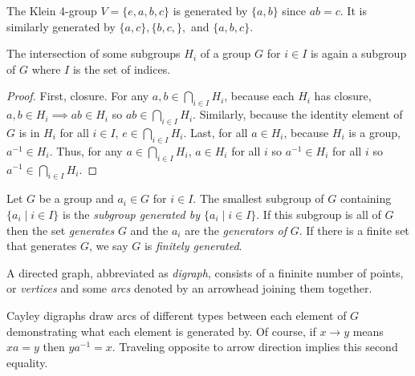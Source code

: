 \begin{example}
    The Klein 4-group $V = \{e,a,b,c\}$ is generated by $\{a,b\}$ since $ab =c$. It is similarly generated by $\{a,c\},\{b,c,\},$ and $\{a,b,c\}$.
\end{example}
\begin{theorem}
    The intersection of some subgroups $H_i$ of a group $G$ for $i \in I$ is again a subgroup of $G$ where $I$ is the set of indices.
\end{theorem}
\begin{proof}
    First, closure. For any $a,b \in \bigcap_{i\in I}H_i$, because each $H_i$ has closure, $a,b \in H_i \implies ab \in H_i$ so $ab \in \bigcap_{i\in I}H_i$. Similarly, because the identity element of $G$ is in $H_i$ for all $i \in I$, $e \in \bigcap_{i\in I}H_i$. Last, for all $a \in H_i$, because $H_i$ is a group, $a^{-1} \in H_i$. Thus, for any $a \in \bigcap_{i \in I}H_i$, $a \in H_i$ for all $i$ so $a^{-1} \in H_i$ for all $i$ so $a^{-1} \in \bigcap_{i \in I}H_i$. 
\end{proof}
\begin{definition}
    Let $G$ be a group and $a_i \in G$ for $i \in I$. The smallest subgroup of $G$ containing $\{a_i\mid i\in I\}$ is the \emph{subgroup generated by $\{a_i\mid i\in I\}$}. If this subgroup is all of $G$ then the set \emph{generates} $G$ and the $a_i$ are the \emph{generators of} $G$. If there is a finite set that generates $G$, we say $G$ is \emph{finitely generated}.
\end{definition}
\begin{definition}[Digraph]
    A directed graph, abbreviated as \emph{digraph}, consists of a fininite number of points, or \emph{vertices} and some \emph{arcs} denoted by an arrowhead joining them together.
\end{definition}
\begin{definition}
    Cayley digraphs draw arcs of different types between each element of $G$ demonstrating what each element is generated by. Of course, if $x\to y$ means $xa=y$ then $ya^{-1}=x$. Traveling opposite to arrow direction implies this second equality.
\end{definition}
